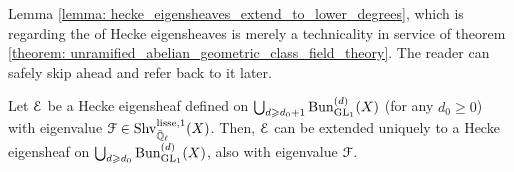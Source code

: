             Lemma \ref{lemma: hecke_eigensheaves_extend_to_lower_degrees}, which is regarding the  of Hecke eigensheaves is merely a technicality in service of theorem \ref{theorem: unramified_abelian_geometric_class_field_theory}. The reader can safely skip ahead and refer back to it later.
            \begin{lemma} \label{lemma: hecke_eigensheaves_extend_to_lower_degrees}
                Let $\mathcal{E}$ be a Hecke eigensheaf defined on $\bigcup_{d \geqslant d_0 + 1} \mathrm{Bun}_{\mathrm{GL}_1}^{(d)}(X)$ (for any $d_0 \geq 0$) with eigenvalue $\mathcal{F} \in \mathrm{Shv}_{\bar{\mathbb{Q}}_{\ell}}^{\mathrm{lisse}, 1}(X)$. Then, $\mathcal{E}$ can be extended uniquely to a Hecke eigensheaf on $\bigcup_{d \geqslant d_0} \mathrm{Bun}_{\mathrm{GL}_1}^{(d)}(X)$, also with eigenvalue $\mathcal{F}$.
            \end{lemma}
